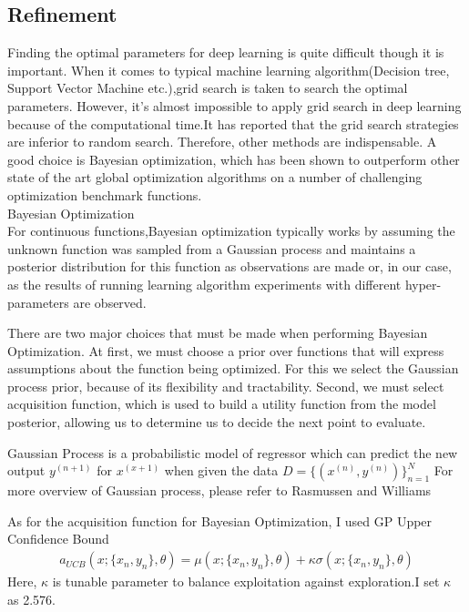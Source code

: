 \subsection{Refinement}

Finding the optimal parameters for deep learning is quite difficult though it is important. When it comes to typical machine learning algorithm(Decision tree, Support Vector Machine etc.),grid search is taken to search the optimal parameters. However, it's almost impossible to apply grid search in deep learning because of the computational time.It has reported that the grid search strategies are inferior to random search.\cite{Random} Therefore, other methods are indispensable. A good choice is Bayesian optimization, which has been shown to outperform other state of the art global optimization algorithms on a number of challenging optimization benchmark functions.\\

Bayesian Optimization\cite{Bayesian Optimization}\\


For continuous functions,Bayesian optimization typically works by assuming the unknown function was sampled from a Gaussian process and maintains a posterior distribution for this function as observations are made or, in our case, as the results of running learning algorithm experiments with different hyper-parameters are observed. 

There are two major choices that must be made when performing Bayesian Optimization. At first, we must choose a prior over functions that will express assumptions about the function being optimized. For this we select the Gaussian process prior, because of its flexibility and tractability. Second, we must select acquisition function, which is used to build a utility function from the model posterior, allowing us to determine us to decide the next point to evaluate.\

Gaussian Process is a probabilistic model of regressor which  can predict the new output $y^{(n+1)}$ for $x^{(x+1)}$ when given the data $D=\{(x^{(n)},y^{(n)})\}^{N}_{n=1}$  
For more overview of Gaussian process, please refer to Rasmussen and Williams\cite{Gaussian}

As for the acquisition function for Bayesian Optimization, I used GP Upper Confidence Bound
 \begin{eqnarray}
a_{UCB}(x;\{x_n,y_n\},\theta)=\mu(x;\{x_n,y_n\},\theta)+\kappa\sigma(x;\{x_n,y_n\},\theta)
\end{eqnarray}
Here, $\kappa$ is tunable parameter to balance exploitation against exploration.I set $\kappa$ as 2.576.


